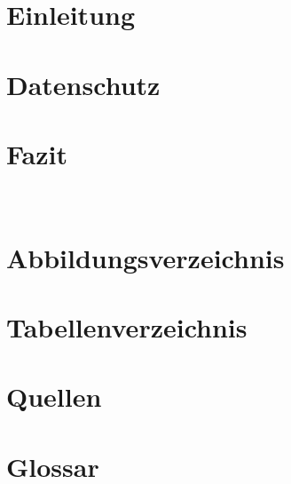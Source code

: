 \documentclass[11pt]{article}
\begin{document}
    
    \pagebreak
    \tableofcontents
    \pagebreak
    \section{Einleitung}
    
    \pagebreak
    \section{Datenschutz}
    
    \pagebreak
    \section{Fazit}
    \\
    \pagebreak
    \section{Abbildungsverzeichnis}
    
    \pagebreak
    \section{Tabellenverzeichnis}
    \listoftables
    \pagebreak
    \section{Quellen}
    
    \pagebreak
    \section{Glossar}
    
\end{document}
